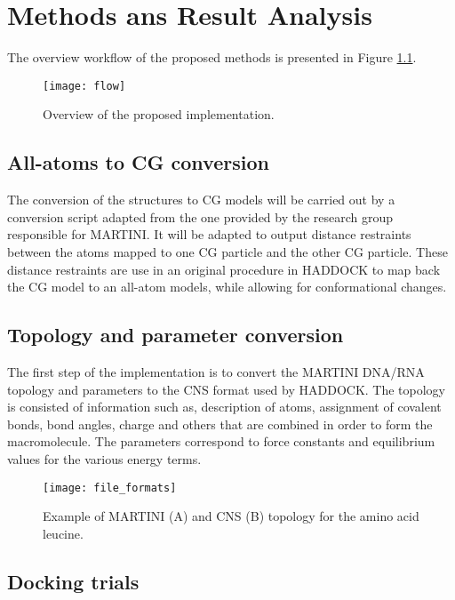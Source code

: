\documentclass[
	12pt,				%
	openright,			%
	twoside,			%
	a4paper,			%
	english,			%
	french,				%
	spanish,			%
	brazil,				%
	]{abntex2}
\begin{document}

\chapter{Methods ans Result Analysis}


The overview workflow of the proposed methods is presented in Figure \ref{fig:flow}.

\begin{figure}[h]
	\centering
	\texttt{[image: flow]}
	\caption{Overview of the proposed implementation.}
	\label{fig:flow}
\end{figure}

\section{All-atoms to CG conversion}

The conversion of the structures to CG models will be carried out by a conversion script adapted from the one provided by the research group responsible for MARTINI. It will be adapted to output distance restraints between the atoms mapped to one CG particle and the other CG particle. These distance restraints are use in an original procedure in HADDOCK to map back the CG model to an all-atom models, while allowing for conformational changes.

\section{Topology and parameter conversion}

The first step of the implementation is to convert the MARTINI DNA/RNA topology and parameters to the CNS format used by HADDOCK. The topology is consisted of information such as, description of atoms, assignment of covalent bonds, bond angles, charge and others that are combined in order to form the macromolecule. The parameters correspond to force constants and equilibrium values for the various energy terms.

\begin{figure}
	\centering
	\texttt{[image: file\_formats]}
	\caption{Example of MARTINI (A) and CNS (B) topology for the amino acid leucine.}
	\label{fig:fileformats}
\end{figure}

\section{Docking trials}
\end{document}

